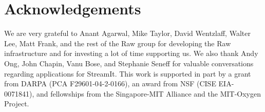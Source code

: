 \section{Acknowledgements}

We are very grateful to Anant Agarwal, Mike Taylor, David Wentzlaff,
Walter Lee, Matt Frank, and the rest of the Raw group for developing
the Raw infrastructure and for investing a lot of time supporting us.
We also thank Andy Ong, John Chapin, Vanu Bose, and Stephanie Seneff
for valuable conversations regarding applications for StreamIt.  This
work is supported in part by a grant from DARPA (PCA
F29601-04-2-0166), an award from NSF (CISE EIA-0071841), and
fellowships from the Singapore-MIT Alliance and the MIT-Oxygen
Project.

